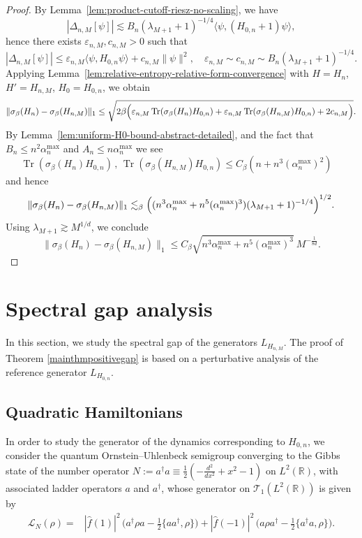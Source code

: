 \documentclass[11pt]{amsart}
\newcommand{\1}{\mathbbm{1}}
\newcommand{\Tr}{\operatorname{Tr}}
\theoremstyle{plain}
\theoremstyle{definition}
\theoremstyle{remark}
\numberwithin{equation}{section}
\begin{document}
\begin{proof}
By Lemma~\ref{lem:product-cutoff-riesz-no-scaling}, we have
\[
|\Delta_{n,M}[\psi]|\lesssim B_n(\lambda_{M+1}+1)^{-1/4}\langle\psi,(H_{0,n}+1)\psi\rangle,
\]
hence there exists \(\varepsilon_{n,M},c_{n,M}>0\) such that
\[
|\Delta_{n,M}[\psi]|\le \varepsilon_{n,M}\langle\psi,H_{0,n}\psi\rangle + c_{n,M}\|\psi\|^2,
\quad
\varepsilon_{n,M}\sim c_{n,M}\sim B_n(\lambda_{M+1}+1)^{-1/4}.
\]
Applying Lemma~\ref{lem:relative-entropy-relative-form-convergence} with \(H=H_n\), \(H'=H_{n,M}\), \(H_0=H_{0,n}\), we obtain
\[
\|\sigma_\beta(H_n)-\sigma_\beta(H_{n,M})\|_1 \le \sqrt{2\beta\Bigl(\varepsilon_{n,M}\Tr(\sigma_\beta(H_n)H_{0,n})+\varepsilon_{n,M}\Tr(\sigma_\beta(H_{n,M})H_{0,n})+2c_{n,M}\Bigr)}.
\]
By Lemma~\ref{lem:uniform-H0-bound-abstract-detailed}, and the fact that $B_n \le n^2\alpha^{\max}_n$ and $A_n\le n \alpha^{\max}_n$ we see 
$$\Tr(\sigma_\beta(H_n)H_{0,n})\, , \,\Tr(\sigma_\beta(H_{n,M})H_{0,n}) \le C_\beta (n + n^3 (\alpha^{\max}_n)^2)\quad$$  and hence
\[
\|\sigma_\beta(H_n)-\sigma_\beta(H_{n,M})\|_1 \lesssim_\beta \Bigl((n^3\alpha^{\max}_n + n^5(\alpha^{\max}_n)^3)(\lambda_{M+1}+1)^{-1/4}\Bigr)^{1/2}.
\]
Using \(\lambda_{M+1}\gtrsim M^{1/d}\), we conclude
\[
\|\sigma_\beta(H_n)-\sigma_\beta(H_{n,M})\|_1 \le C_\beta \sqrt{n^3\alpha^{\max}_n + n^5(\alpha^{\max}_n)^3}\ M^{-\frac{1}{8d}}.
\]
\end{proof}


\section{Spectral gap analysis}
\label{section:Pert_Theory}


\noindent In this section, we study the spectral gap of the generators $L_{H_{n,M}}$. The proof of Theorem \ref{mainthmpositivegap} is based on a perturbative analysis of the reference generator $L_{H_{0,n}}$.

\subsection{Quadratic Hamiltonians}



\noindent In order to study the generator of the dynamics corresponding to $H_{0,n}$, we consider the quantum Ornstein–Uhlenbeck semigroup converging to the Gibbs state of the number operator $N:=a^\dagger a\equiv \frac{1}{2}(-\frac{d^2}{dx^2}+x^2-1)$ on $L^2(\mathbb{R})$, with associated ladder operators $a$ and $a^\dagger$, whose generator on $\mathscr{T}_1(L^2(\mathbb{R}))$ is given by \cite{OU}
\begin{align}
\label{eq:qOUgen}
\mathcal{L}_{N}(\rho)
=&|\widehat{f}(1)|^2\,\Big(a^\dagger \rho a-\frac{1}{2}\{aa^\dagger,\rho\}\Big)
+|\widehat{f}(-1)|^2\,\Big(a\rho a^\dagger-\frac{1}{2}\{a^\dagger a,\rho\}\Big).
\end{align}
\end{document}
